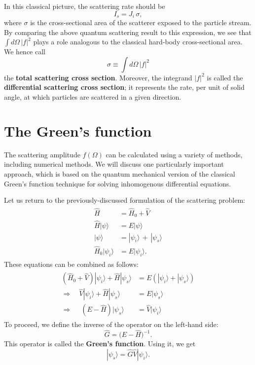 \documentclass[pra,12pt]{revtex4}
\begin{document}
\noindent
In this classical picture, the scattering rate should be
\begin{equation}
  I_s = J_i \, \sigma,
\end{equation}
where $\sigma$ is the cross-sectional area of the scatterer exposed to
the particle stream.  By comparing the above quantum scattering result
to this expression, we see that $\int d\Omega\,|f|^2$ plays a role
analogous to the classical hard-body cross-sectional area.  We hence
call
\begin{equation}
  \sigma \equiv \int d\Omega\,|f|^2
\end{equation}
the \textbf{total scattering cross section}.  Moreover, the integrand
$|f|^2$ is called the \textbf{differential scattering cross section};
it represents the rate, per unit of solid angle, at which particles
are scattered in a given direction.

\section{The Green's function}
\label{sec:greensfun}

The scattering amplitude $f(\Omega)$ can be calculated using a variety
of methods, including numerical methods.  We will discuss one
particularly important approach, which is based on the quantum
mechanical version of the classical Green's function technique for
solving inhomogenous differential equations.

Let us return to the previously-discussed formulation of the
scattering problem:
\begin{align}
  \begin{aligned} \hat{H} &= \hat{H}_0+\hat{V} \\ \hat{H} |\psi\rangle &= E |\psi\rangle \\ |\psi\rangle &= |\psi_i\rangle \,+\, |\psi_s\rangle \\ \hat{H}_0 |\psi_i\rangle &= E |\psi_i\rangle.\end{aligned}
\end{align}
These equations can be combined as follows:
\begin{align}
  \begin{aligned} \left(\hat{H}_0 + \hat{V}\right) |\psi_i\rangle + \hat{H} |\psi_s\rangle &= E \left( |\psi_i\rangle + |\psi_s\rangle \right) \\ \Rightarrow \quad \hat{V} |\psi_i\rangle + \hat{H} |\psi_s\rangle &= E |\psi_s\rangle  \\ \Rightarrow \quad\; \left(E - \hat{H}\right) |\psi_s\rangle & = \hat{V} |\psi_i\rangle
  \end{aligned}
\end{align}
To proceed, we define the inverse of the operator on the left-hand
side:
\begin{equation}
  \hat{G} = \big(E-\hat{H}\big)^{-1}.
\end{equation}
This operator is called the \textbf{Green's function}.  Using it, we
get
\begin{equation}
  |\psi_s\rangle = \hat{G} \hat{V} |\psi_i\rangle.
\end{equation}
\end{document}
